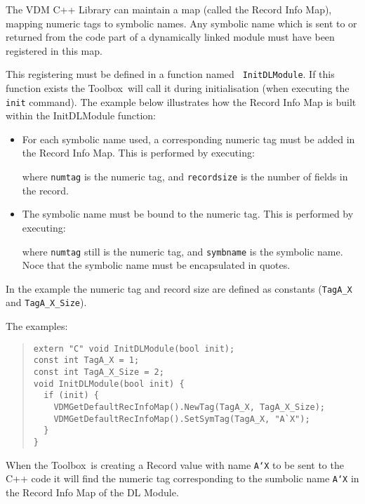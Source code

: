 \documentclass[\pformat,12pt]{article}
\newcommand{\Toolbox}{Toolbox}
\begin{document}
The VDM C++ Library can maintain a map (called the Record Info Map),
mapping numeric tags to symbolic names.  Any symbolic name which is
sent to or returned from the code part of a dynamically linked module
must have been registered in this map.

This registering must be defined in a function named {\tt
  InitDLModule}.  If this function exists the \Toolbox\ will call it
during initialisation (when executing the {\tt init} command).  The
example below illustrates how the Record Info Map is built within the
InitDLModule function:
\begin{itemize}
\item For each symbolic name used, a corresponding numeric tag must be
  added in the Record Info Map.  This is performed by executing:

  \hspace*{1em}{\tt VDMGetDefaultRecInfoMap().NewTag(numtag, recordsize);}
  
  where {\tt numtag} is the numeric tag, and {\tt recordsize} is the
  number of fields in the record.
\item The symbolic name must be bound to the numeric tag.  This is
  performed by executing:

  \hspace*{1em}{\tt VDMGetDefaultRecInfoMap().SetSymTag(numtag, "symbname"); }
  
  where {\tt numtag} still is the numeric tag, and {\tt symbname} is
  the symbolic name. Noce that the symbolic name must be encapsulated
  in quotes.
\end{itemize}


In the example the numeric tag and record size are defined as
constants ({\tt TagA\_X} and {\tt TagA\_X\_Size}).

The examples:
\begin{quote}
\begin{verbatim}
extern "C" void InitDLModule(bool init); 
const int TagA_X = 1; 
const int TagA_X_Size = 2; 
void InitDLModule(bool init) {
  if (init) {
    VDMGetDefaultRecInfoMap().NewTag(TagA_X, TagA_X_Size);
    VDMGetDefaultRecInfoMap().SetSymTag(TagA_X, "A`X"); 
  }
}
\end{verbatim}
\end{quote}

When the \Toolbox\ is creating a Record value with name {\tt A`X} to
be sent to the C++ code it will find the numeric tag corresponding to
the sumbolic name {\tt A`X} in the Record Info Map of the DL Module.
\end{document}
